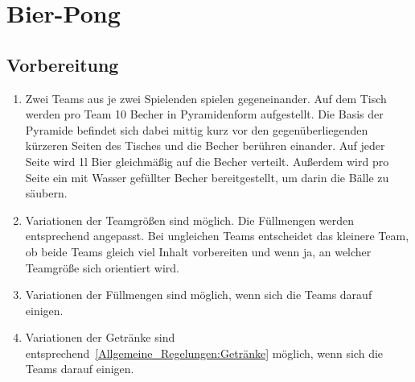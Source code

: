 \chapter{Bier-Pong}
\section{Vorbereitung}
\begin{enumerate}[label={(\arabic*)}]
    \item
    Zwei Teams aus je zwei Spielenden spielen gegeneinander.
    Auf dem Tisch werden pro Team 10 Becher in Pyramidenform aufgestellt.
    Die Basis der Pyramide befindet sich dabei mittig kurz vor den gegenüberliegenden kürzeren Seiten des Tisches und die Becher berühren einander.
    Auf jeder Seite wird 1l Bier gleichmäßig auf die Becher verteilt.
    Außerdem wird pro Seite ein mit Wasser gefüllter Becher bereitgestellt, um darin die Bälle zu säubern.

    \item
    Variationen der Teamgrößen sind möglich.
    Die Füllmengen werden entsprechend angepasst.
    Bei ungleichen Teams entscheidet das kleinere Team, ob beide Teams gleich viel Inhalt vorbereiten und wenn ja, an welcher Teamgröße sich orientiert wird.

    \item
    Variationen der Füllmengen sind möglich, wenn sich die Teams darauf einigen.

    \item
    Variationen der Getränke sind entsprechend~\ref{Allgemeine_Regelungen:Getränke} möglich, wenn sich die Teams darauf einigen.
\end{enumerate}


